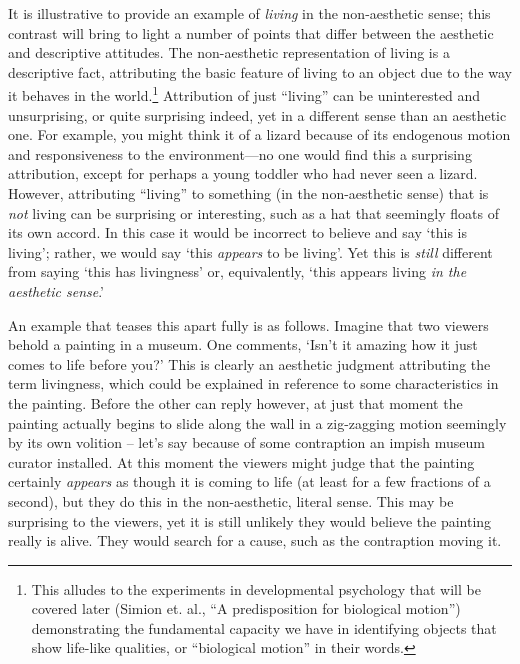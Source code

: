 It is illustrative to provide an example of \emph{living} in the
non-aesthetic sense; this contrast will bring to light a number of
points that differ between the aesthetic and descriptive attitudes. The
non-aesthetic representation of living is a descriptive fact,
attributing the basic feature of living to an object due to the way it
behaves in the world.\footnote{This alludes to the experiments in
  developmental psychology that will be covered later (Simion et. al.,
  ``A predisposition for biological motion'') demonstrating the
  fundamental capacity we have in identifying objects that show
  life-like qualities, or ``biological motion'' in their words.}
Attribution of just ``living'' can be uninterested and unsurprising, or
quite surprising indeed, yet in a different sense than an aesthetic one.
For example, you might think it of a lizard because of its endogenous
motion and responsiveness to the environment---no one would find this a
surprising attribution, except for perhaps a young toddler who had never
seen a lizard. However, attributing ``living'' to something (in the
non-aesthetic sense) that is \emph{not} living can be surprising or
interesting, such as a hat that seemingly floats of its own accord. In
this case it would be incorrect to believe and say `this is living';
rather, we would say `this \emph{appears} to be living'. Yet this is
\emph{still} different from saying `this has livingness' or,
equivalently, `this appears living \emph{in the aesthetic sense}.'

An example that teases this apart fully is as follows. Imagine that two
viewers behold a painting in a museum. One comments, `Isn't it amazing
how it just comes to life before you?' This is clearly an aesthetic
judgment attributing the term livingness, which could be explained in
reference to some characteristics in the painting. Before the other can
reply however, at just that moment the painting actually begins to slide
along the wall in a zig-zagging motion seemingly by its own volition --
let's say because of some contraption an impish museum curator
installed. At this moment the viewers might judge that the painting
certainly \emph{appears} as though it is coming to life (at least for a
few fractions of a second), but they do this in the non-aesthetic,
literal sense. This may be surprising to the viewers, yet it is still
unlikely they would believe the painting really is alive. They would
search for a cause, such as the contraption moving it.

